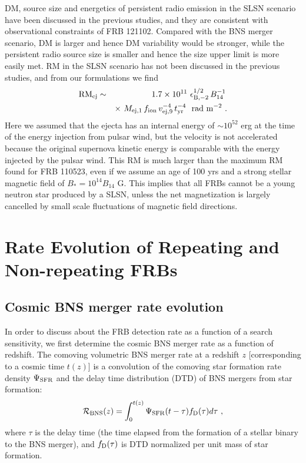 \documentclass[]{pasj01}
\begin{document}
DM, source size and energetics of persistent radio emission in the
SLSN scenario have been discussed in the previous studies, and they
are consistent with observational constraints of FRB 121102.  Compared
with the BNS merger scenario, DM is larger and hence DM variability
would be stronger, while the persistent radio source size is smaller
and hence the size upper limit is more easily met. RM in the SLSN
scenario has not been discussed in the previous studies, and from our
formulations we find
\begin{eqnarray}
{\rm RM_{\rm ej}} &\sim& 1.7 \times 10^{11}
\ \epsilon_{{\rm B},-2}^{1/2}\,B_{14}^{-1}\, \nonumber \\
&& \times \ M_{{\rm ej},1}\,f_{\rm
    ion}\, v_{{\rm ej},9}^{-4}\,t_{\rm yr}^{-4}
\ \ {\rm rad \ m^{-2}} \ .
\end{eqnarray}
Here we assumed that the ejecta has an internal energy of $\sim
10^{52}$ erg at the time of the energy injection from pulsar wind, but
the velocity is not accelerated because the original supernova kinetic
energy is comparable with the energy injected by the pulsar wind.
This RM is much larger than the maximum RM found for FRB 110523, even
if we assume an age of 100 yrs and a strong stellar magnetic field of
$B_*=10^{14} B_{14}$ G.  This implies that all FRBs cannot be a young
neutron star produced by a SLSN, unless the net magnetization is
largely cancelled by small scale fluctuations of magnetic field
directions.



\section{Rate Evolution of Repeating and Non-repeating FRBs}
\label{sec:rate}

\subsection{Cosmic BNS merger rate evolution}

In order to discuss about the FRB detection rate as a function of a
search sensitivity, we first determine the cosmic BNS merger rate as a
function of redshift.  The comoving volumetric BNS merger rate at a
redshift $z$ [corresponding to a cosmic time $t(z)$] is a convolution
of the comoving star formation rate density $\Psi_{\rm SFR}$ and the
delay time distribution (DTD) of BNS mergers from star formation:
\begin{eqnarray}
{\cal R}_{\rm BNS}(z) =  
\int_{0}^{t(z)}\Psi_{\rm SFR}(t-\tau)f_{\rm D}(\tau)d\tau 
 \ ,
\end{eqnarray}
where $\tau$ is the delay time (the time elapsed from the formation of
a stellar binary to the BNS merger), and $f_{\rm D}(\tau)$ is DTD
normalized per unit mass of star formation. 
\end{document}
